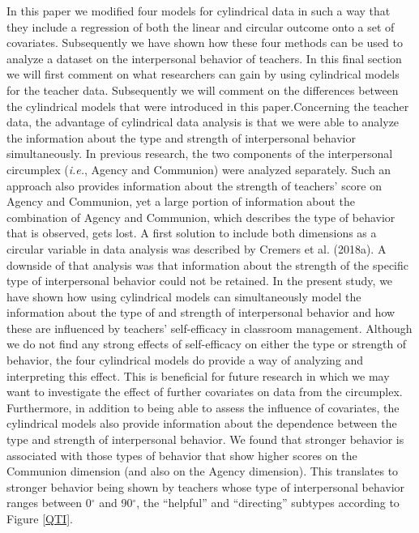 \documentclass[man]{apa6}
\theoremstyle{definition}
\theoremstyle{definition}
\theoremstyle{definition}
\theoremstyle{remark}
\begin{document}
In this paper we modified four models for cylindrical data in such a way
that they include a regression of both the linear and circular outcome
onto a set of covariates. Subsequently we have shown how these four
methods can be used to analyze a dataset on the interpersonal behavior
of teachers. In this final section we will first comment on what
researchers can gain by using cylindrical models for the teacher data.
Subsequently we will comment on the differences between the cylindrical
models that were introduced in this paper.\newline \indent Concerning
the teacher data, the advantage of cylindrical data analysis is that we
were able to analyze the information about the type and strength of
interpersonal behavior simultaneously. In previous research, the two
components of the interpersonal circumplex (\emph{i.e.}, Agency and
Communion) were analyzed separately. Such an approach also provides
information about the strength of teachers' score on Agency and
Communion, yet a large portion of information about the combination of
Agency and Communion, which describes the type of behavior that is
observed, gets lost. A first solution to include both dimensions as a
circular variable in data analysis was described by Cremers et al.
(2018a). A downside of that analysis was that information about the
strength of the specific type of interpersonal behavior could not be
retained. In the present study, we have shown how using cylindrical
models can simultaneously model the information about the type of and
strength of interpersonal behavior and how these are influenced by
teachers' self-efficacy in classroom management. Although we do not find
any strong effects of self-efficacy on either the type or strength of
behavior, the four cylindrical models do provide a way of analyzing and
interpreting this effect. This is beneficial for future research in
which we may want to investigate the effect of further covariates on
data from the circumplex. Furthermore, in addition to being able to
assess the influence of covariates, the cylindrical models also provide
information about the dependence between the type and strength of
interpersonal behavior. We found that stronger behavior is associated
with those types of behavior that show higher scores on the Communion
dimension (and also on the Agency dimension). This translates to
stronger behavior being shown by teachers whose type of interpersonal
behavior ranges between 0\(^\circ\) and 90\(^\circ\), the
\enquote{helpful} and \enquote{directing} subtypes according to Figure
\ref{QTI}.
\end{document}
